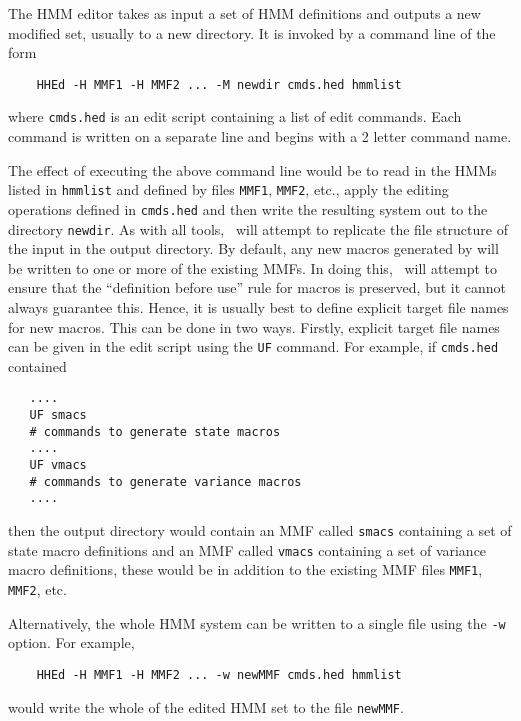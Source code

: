 
The HMM editor  takes as input a set of HMM definitions and
outputs a new modified set, usually to a new directory.  It is invoked
by a command line of the form
\begin{verbatim}
    HHEd -H MMF1 -H MMF2 ... -M newdir cmds.hed hmmlist
\end{verbatim}
where \texttt{cmds.hed} is an edit script containing 
a list of edit commands.  Each command
is written on a separate line and begins with a 2 letter command name.

The effect
of  executing the above command line would be to read in the HMMs listed in 
\texttt{hmmlist} and defined
by files \texttt{MMF1}, \texttt{MMF2}, etc., apply  the editing operations
defined in \texttt{cmds.hed} and then write the resulting system out
to the directory \texttt{newdir}.  As with all tools, \HTK\ will
attempt to replicate the file structure of the input in the output
directory.  By default, any new macros generated by  will be
written to one or more of the existing MMFs.  In doing this, \HTK\ will
attempt to ensure that the ``definition before use'' rule for macros is
preserved, but it cannot always guarantee this.  Hence, it is usually
best to define explicit target file names for new macros.  This can be
done in two ways.  Firstly,   explicit target file names can be 
given in the edit script
using the \texttt{UF} command.
For example, if \texttt{cmds.hed} contained
\begin{verbatim}
   ....
   UF smacs
   # commands to generate state macros
   ....
   UF vmacs
   # commands to generate variance macros
   ....
\end{verbatim}
then the output directory would contain an MMF called \texttt{smacs} 
containing a set of state macro definitions and an MMF called \texttt{vmacs} 
containing a set of variance macro definitions, these would be in addition
to the existing MMF files \texttt{MMF1}, \texttt{MMF2}, etc.

Alternatively, the whole HMM system can be written to a single
file using the \texttt{-w} option.  For example, 
\begin{verbatim}
    HHEd -H MMF1 -H MMF2 ... -w newMMF cmds.hed hmmlist
\end{verbatim}
would write the whole of the edited HMM set to the file \texttt{newMMF}.

